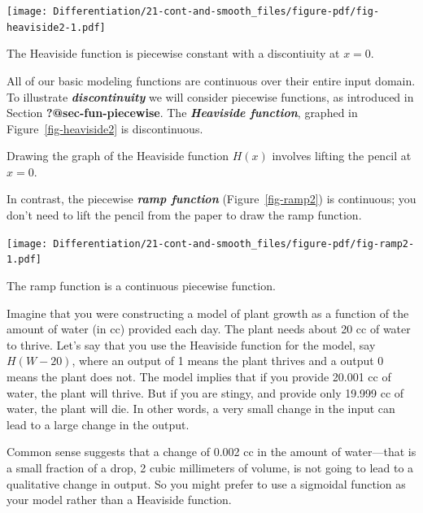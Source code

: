 \documentclass[
  letterpaper,
  DIV=11,
  numbers=noendperiod,
  oneside]{scrreprt}
\begin{document}
\begin{marginfigure}

{\centering \texttt{[image: Differentiation/21-cont-and-smooth\_files/figure-pdf/fig-heaviside2-1.pdf]}

}

\caption{\label{fig-heaviside2}The Heaviside function is piecewise
constant with a discontiuity at \(x=0\).}

\end{marginfigure}

All of our basic modeling functions are continuous over their entire
input domain. To illustrate \textbf{\emph{discontinuity}} we will
consider piecewise functions, as introduced in Section
\textbf{?@sec-fun-piecewise}. The \textbf{\emph{Heaviside function}},
graphed in Figure~\ref{fig-heaviside2} is discontinuous.

Drawing the graph of the Heaviside function \(H(x)\) involves lifting
the pencil at \(x=0\).

In contrast, the piecewise \textbf{\emph{ramp function}}
(Figure~\ref{fig-ramp2}) is continuous; you don't need to lift the
pencil from the paper to draw the ramp function.

\begin{marginfigure}

{\centering \texttt{[image: Differentiation/21-cont-and-smooth\_files/figure-pdf/fig-ramp2-1.pdf]}

}

\caption{\label{fig-ramp2}The ramp function is a continuous piecewise
function.}

\end{marginfigure}

Imagine that you were constructing a model of plant growth as a function
of the amount of water (in cc) provided each day. The plant needs about
20 cc of water to thrive. Let's say that you use the Heaviside function
for the model, say \(H(W-20)\), where an output of 1 means the plant
thrives and a output 0 means the plant does not. The model implies that
if you provide 20.001 cc of water, the plant will thrive. But if you are
stingy, and provide only 19.999 cc of water, the plant will die. In
other words, a very small change in the input can lead to a large change
in the output.

Common sense suggests that a change of 0.002 cc in the amount of
water---that is a small fraction of a drop, 2 cubic millimeters of
volume, is not going to lead to a qualitative change in output. So you
might prefer to use a sigmoidal function as your model rather than a
Heaviside function.
\end{document}
